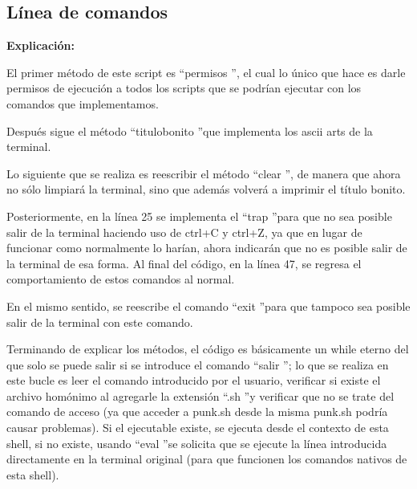 \documentclass[letter,12pt]{article} %
\begin{document}
\subsection{Línea de comandos}
\textbf{Explicación:} \par
El primer método de este script es \textquotedblleft permisos \textquotedblright, el cual lo único que hace es darle permisos de ejecución a todos los scripts que se podrían ejecutar con los comandos que implementamos.\\
\vspace{\baselineskip}

Después sigue el método \textquotedblleft titulobonito \textquotedblright que implementa los ascii arts de la terminal.\\
\vspace{\baselineskip}

Lo siguiente que se realiza es reescribir el método \textquotedblleft clear \textquotedblright, de manera que ahora no sólo limpiará la terminal, sino que además volverá a imprimir el título bonito.\\
\vspace{\baselineskip}

Posteriormente, en la línea 25 se implementa el \textquotedblleft trap \textquotedblright para que no sea posible salir de la terminal haciendo uso de ctrl+C y ctrl+Z, ya que en lugar de funcionar como normalmente lo harían, ahora indicarán que no es posible salir de la terminal de esa forma. Al final del código, en la línea 47, se regresa el comportamiento de estos comandos al normal.\\
\vspace{\baselineskip}

En el mismo sentido, se reescribe el comando \textquotedblleft exit \textquotedblright para que tampoco sea posible salir de la terminal con este comando.\\
\vspace{\baselineskip}

Terminando de explicar los métodos, el código es básicamente un while eterno del que solo se puede salir si se introduce el comando \textquotedblleft salir \textquotedblright; lo que se realiza en este bucle es leer el comando introducido por el usuario, verificar si existe el archivo homónimo al agregarle la extensión \textquotedblleft .sh \textquotedblright y verificar que no se trate del comando de acceso (ya que acceder a punk.sh desde la misma punk.sh podría causar problemas). Si el ejecutable existe, se ejecuta desde el contexto de esta shell, si no existe, usando \textquotedblleft eval \textquotedblright se solicita que se ejecute la línea introducida directamente en la terminal original (para que funcionen los comandos nativos de esta shell).\\
\vspace{\baselineskip}
\end{document}
